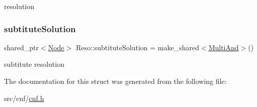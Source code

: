resolution 

\mbox{\label{struct_reso_a05bb25e26bbb88ef723dae77656fb0d4}} 
\subsubsection{\texorpdfstring{subtitute\+Solution}{subtituteSolution}}
{\footnotesize\ttfamily shared\+\_\+ptr$<$\hyperlink{class_node}{Node}$>$ Reso\+::subtitute\+Solution = make\+\_\+shared$<$\hyperlink{class_multi_and}{Multi\+And}$>$()}



subtitute resolution 



The documentation for this struct was generated from the following file\+:\begin{DoxyCompactItemize}
\item 
src/cnf/\hyperlink{cnf_8h}{cnf.\+h}\end{DoxyCompactItemize}
